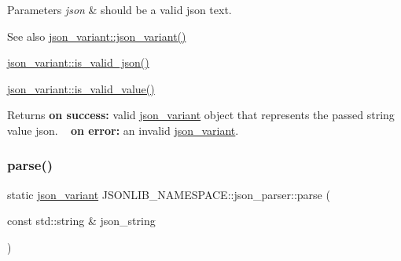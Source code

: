 \begin{DoxyParams}{Parameters}
{\em json} & should be a valid json text. \\
\hline
\end{DoxyParams}
\begin{DoxySeeAlso}{See also}
\hyperlink{classJSONLIB__NAMESPACE_1_1json__variant_a846c20ca7916959fcf8768f6c5bac36d}{json\+\_\+variant\+::json\+\_\+variant()} 

\hyperlink{classJSONLIB__NAMESPACE_1_1json__variant_a158e3148d9256af3d1b8251b2ca7b6c4}{json\+\_\+variant\+::is\+\_\+valid\+\_\+json()} 

\hyperlink{classJSONLIB__NAMESPACE_1_1json__variant_a224aab2dd56e3928dd893be8b7f3367a}{json\+\_\+variant\+::is\+\_\+valid\+\_\+value()} 
\end{DoxySeeAlso}
\begin{DoxyReturn}{Returns}
{\bfseries on success\+:} valid \hyperlink{classJSONLIB__NAMESPACE_1_1json__variant}{json\+\_\+variant} object that represents the passed string value {\ttfamily json}. ~\newline
 {\bfseries on error\+:} an invalid \hyperlink{classJSONLIB__NAMESPACE_1_1json__variant}{json\+\_\+variant}. 
\end{DoxyReturn}
\mbox{\label{classJSONLIB__NAMESPACE_1_1json__parser_a92cc0ccf4fe28eea7a588d5bb7562510}} 
\subsubsection{\texorpdfstring{parse()}{parse()}\hspace{0.1cm}{\footnotesize\ttfamily [2/2]}}
{\footnotesize\ttfamily static \hyperlink{classJSONLIB__NAMESPACE_1_1json__variant}{json\+\_\+variant} J\+S\+O\+N\+L\+I\+B\+\_\+\+N\+A\+M\+E\+S\+P\+A\+C\+E\+::json\+\_\+parser\+::parse (\begin{DoxyParamCaption}\item[{const std\+::string \&}]{json\+\_\+string }\end{DoxyParamCaption})\hspace{0.3cm}{\ttfamily [static]}}




